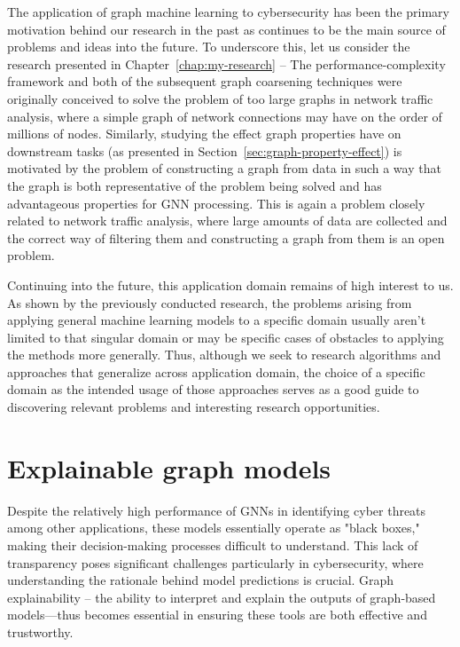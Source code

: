The application of graph machine learning to cybersecurity has been the primary motivation behind our research in the past as continues to be the main source of problems and ideas into the future. To underscore this, let us consider the research presented in Chapter~\ref{chap:my-research} -- The performance-complexity framework and both of the subsequent graph coarsening techniques were originally conceived to solve the problem of too large graphs in network traffic analysis, where a simple graph of network connections may have on the order of millions of nodes. Similarly, studying the effect graph properties have on downstream tasks (as presented in Section~\ref{sec:graph-property-effect}) is motivated by the problem of constructing a graph from data in such a way that the graph is both representative of the problem being solved and has advantageous properties for GNN processing. This is again a problem closely related to network traffic analysis, where large amounts of data are collected and the correct way of filtering them and constructing a graph from them is an open problem.


Continuing into the future, this application domain remains of high interest to us. As shown by the previously conducted research, the problems arising from applying general machine learning models to a specific domain usually aren't limited to that singular domain or may be specific cases of obstacles to applying the methods more generally. Thus, although we seek to research algorithms and approaches that generalize across application domain, the choice of a specific domain as the intended usage of those approaches serves as a good guide to discovering relevant problems and interesting research opportunities.

\section{Explainable graph models}

Despite the relatively high performance of GNNs in identifying cyber threats among other applications, these models essentially operate as "black boxes," making their decision-making processes difficult to understand. This lack of transparency poses significant challenges particularly in cybersecurity, where understanding the rationale behind model predictions is crucial. Graph explainability -- the ability to interpret and explain the outputs of graph-based models—thus becomes essential in ensuring these tools are both effective and trustworthy.

